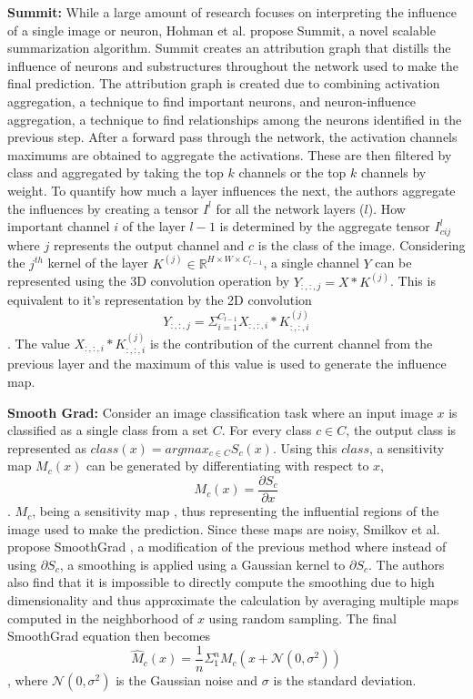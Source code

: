 \documentclass[a4paper,11pt,openright]{book}
\begin{document}
\textbf{Summit: }
While a large amount of research focuses on interpreting the influence of a single image or neuron, Hohman et al. propose Summit, \cite{hohmanSummitScalingDeep2019} a novel scalable summarization algorithm. Summit creates an attribution graph that distills the influence of neurons and substructures throughout the network used to make the final prediction. The attribution graph is created due to combining activation aggregation, a technique to find important neurons, and neuron-influence aggregation, a technique to find relationships among the neurons identified in the previous step. After a forward pass through the network, the activation channels maximums are obtained to aggregate the activations. These are then filtered by class and aggregated by taking the top $k$ channels or the top $k$ channels by weight. To quantify how much a layer influences the next, the authors aggregate the influences by creating a tensor $I^{l}$ for all the network layers ($l$). How important channel $i$ of the layer $l-1$ is determined by the aggregate tensor $I^{l}_{cij}$ where $j$ represents the output channel and $c$ is the class of the image. Considering the $j^{th}$ kernel of the layer $K^{(j)} \in \mathbb{R}^{H \times W \times C_{l-1}}$, a single channel $Y$ can be represented using the 3D convolution operation by $Y_{:,:,j}= X \ast K^{(j)}$. This is equivalent to it's representation by the 2D convolution $$Y_{:,:,j}= \Sigma_{i=1}^{C_{l-1}} X_{:,:,i} \ast K^{(j)}_{:,:,i}$$. The value $X_{:,:, i} \ast K^{(j)}_{:,:, i}$ is the contribution of the current channel from the previous layer and the maximum of this value is used to generate the influence map.

\textbf{Smooth Grad: }
Consider an image classification task where an input image $x$ is classified as a single class from a set $C$. For every class $c \in C$, the output class is represented as $class(x) = argmax_{c \in C}S_{c}(x)$. Using this $class$, a sensitivity map $M_{c}(x)$ can be generated by differentiating with respect to $x$, $$M_{c}(x) = \frac{\partial S_{c}}{\partial x}$$ . $M_{c}$, being a sensitivity map \cite{simonyanDeepConvolutionalNetworks2014}, thus representing the influential regions of the image used to make the prediction. Since these maps are noisy, Smilkov et al. propose SmoothGrad \cite{smilkovSmoothGradRemovingNoise2017}, a modification of the previous method where instead of using $\partial S_{c}$, a smoothing is applied using a Gaussian kernel to $\partial S_{c}$. The authors also find that it is impossible to directly compute the smoothing due to high dimensionality and thus approximate the calculation by averaging multiple maps computed in the neighborhood of $x$ using random sampling. The final SmoothGrad equation then becomes $$\hat M_{c}(x) = \frac{1}{n}\Sigma_{1}^{n}M_{c}(x + \mathcal{N}(0, \sigma^{2}))$$, where $\mathcal{N}(0, \sigma^{2})$ is the Gaussian noise and $\sigma$ is the standard deviation.
\end{document}
